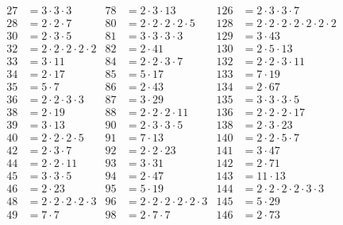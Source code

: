 \begin{align*}
  27&=3\cdot3\cdot3             &  78&=2\cdot3\cdot13                  & 126&=2\cdot3\cdot3\cdot7                   \\
  28&=2\cdot2\cdot7             &  80&=2\cdot2\cdot2\cdot2\cdot5       & 128&=2\cdot2\cdot2\cdot2\cdot2\cdot2\cdot2 \\
  30&=2\cdot3\cdot5             &  81&=3\cdot3\cdot3\cdot3             & 129&=3\cdot43                              \\
  32&=2\cdot2\cdot2\cdot2\cdot2 &  82&=2\cdot41                        & 130&=2\cdot5\cdot13                        \\
  33&=3\cdot11                  &  84&=2\cdot2\cdot3\cdot7             & 132&=2\cdot2\cdot3\cdot11                  \\
  34&=2\cdot17                  &  85&=5\cdot17                        & 133&=7\cdot19                              \\
  35&=5\cdot7                   &  86&=2\cdot43                        & 134&=2\cdot67                              \\
  36&=2\cdot2\cdot3\cdot3       &  87&=3\cdot29                        & 135&=3\cdot3\cdot3\cdot5                   \\
  38&=2\cdot19                  &  88&=2\cdot2\cdot2\cdot11            & 136&=2\cdot2\cdot2\cdot17                  \\
  39&=3\cdot13                  &  90&=2\cdot3\cdot3\cdot5             & 138&=2\cdot3\cdot23                        \\
  40&=2\cdot2\cdot2\cdot5       &  91&=7\cdot13                        & 140&=2\cdot2\cdot5\cdot7                   \\
  42&=2\cdot3\cdot7             &  92&=2\cdot2\cdot23                  & 141&=3\cdot47                              \\
  44&=2\cdot2\cdot11            &  93&=3\cdot31                        & 142&=2\cdot71                              \\
  45&=3\cdot3\cdot5             &  94&=2\cdot47                        & 143&=11\cdot13                             \\
  46&=2\cdot23                  &  95&=5\cdot19                        & 144&=2\cdot2\cdot2\cdot2\cdot3\cdot3       \\
  48&=2\cdot2\cdot2\cdot2\cdot3 &  96&=2\cdot2\cdot2\cdot2\cdot2\cdot3 & 145&=5\cdot29                              \\
  49&=7\cdot7                   &  98&=2\cdot7\cdot7                   & 146&=2\cdot73                              \\

\end{align*}

